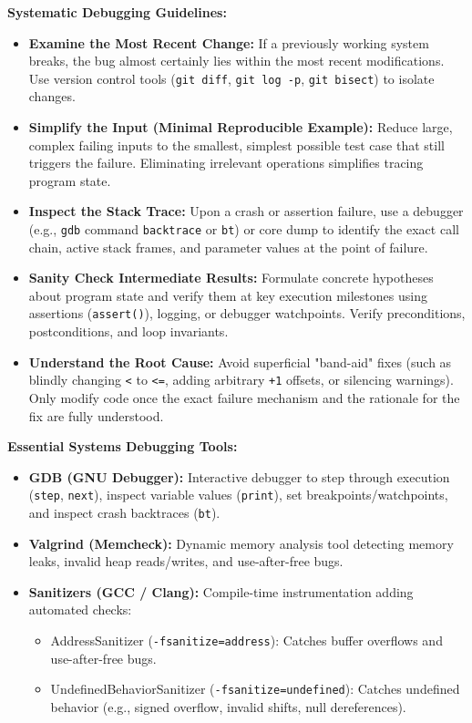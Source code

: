 \begin{definition}
    \textbf{Systematic Debugging Guidelines:}
    \begin{itemize}
        \item \textbf{Examine the Most Recent Change:} If a previously working system breaks, the bug almost certainly lies within the most recent modifications. Use version control tools (\texttt{git diff}, \texttt{git log -p}, \texttt{git bisect}) to isolate changes.
        \item \textbf{Simplify the Input (Minimal Reproducible Example):} Reduce large, complex failing inputs to the smallest, simplest possible test case that still triggers the failure. Eliminating irrelevant operations simplifies tracing program state.
        \item \textbf{Inspect the Stack Trace:} Upon a crash or assertion failure, use a debugger (e.g., \texttt{gdb} command \texttt{backtrace} or \texttt{bt}) or core dump to identify the exact call chain, active stack frames, and parameter values at the point of failure.
        \item \textbf{Sanity Check Intermediate Results:} Formulate concrete hypotheses about program state and verify them at key execution milestones using assertions (\texttt{assert()}), logging, or debugger watchpoints. Verify preconditions, postconditions, and loop invariants.
        \item \textbf{Understand the Root Cause:} Avoid superficial "band-aid" fixes (such as blindly changing \texttt{<} to \texttt{<=}, adding arbitrary \texttt{+1} offsets, or silencing warnings). Only modify code once the exact failure mechanism and the rationale for the fix are fully understood.
    \end{itemize}
\end{definition}

\begin{remark}
    \textbf{Essential Systems Debugging Tools:}
    \begin{itemize}
        \item \textbf{GDB (GNU Debugger):} Interactive debugger to step through execution (\texttt{step}, \texttt{next}), inspect variable values (\texttt{print}), set breakpoints/watchpoints, and inspect crash backtraces (\texttt{bt}).
        \item \textbf{Valgrind (Memcheck):} Dynamic memory analysis tool detecting memory leaks, invalid heap reads/writes, and use-after-free bugs.
        \item \textbf{Sanitizers (GCC / Clang):} Compile-time instrumentation adding automated checks:
        \begin{itemize}
            \item AddressSanitizer (\texttt{-fsanitize=address}): Catches buffer overflows and use-after-free bugs.
            \item UndefinedBehaviorSanitizer (\texttt{-fsanitize=undefined}): Catches undefined behavior (e.g., signed overflow, invalid shifts, null dereferences).
        \end{itemize}
    \end{itemize}
\end{remark}
